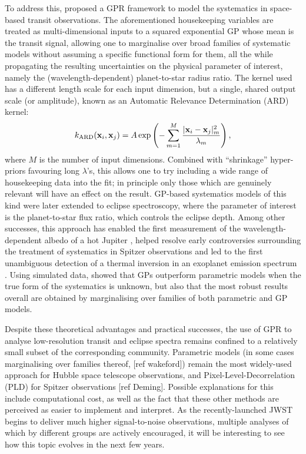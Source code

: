 \documentclass[letterpaper]{ar-1col}
\begin{document}
To address this, \citet{2012MNRAS.419.2683G} proposed a GPR framework to model the systematics in space-based transit observations. The aforementioned housekeeping variables are treated as multi-dimensional inputs to a squared exponential GP whose mean is the transit signal, allowing one to marginalise over broad families of systematic models without assuming a specific functional form for them, all the while propagating the resulting uncertainties on the physical parameter of interest, namely the (wavelength-dependent) planet-to-star radius ratio. The kernel used has a different length scale for each input dimension, but a single, shared output scale (or amplitude), known as an Automatic Relevance Determination (ARD) kernel:
\begin{equation}
    k_{\rm ARD}(\mathbf{x}_i, \mathbf{x}_j) = A \exp \left( - \sum_{m=1}^M \frac{|\mathbf{x}_i-\mathbf{x}_j|_m^2}{\lambda_m} \right),
\end{equation}
where $M$ is the number of input dimensions. Combined with ``shrinkage'' hyper-priors favouring long $\lambda$'s, this allows one to try including a wide range of housekeeping data into the fit; in principle only those which are genuinely relevant will have an effect on the result.
GP-based systematics models of this kind were later extended to eclipse spectroscopy, where the parameter of interest is the planet-to-star flux ratio, which controls the eclipse depth. Among other successes, this approach has enabled the first measurement of the wavelength-dependent albedo of a hot Jupiter \citep{2013ApJ...772L..16E}, helped resolve early controversies surrounding the treatment of systematics in Spitzer observations \citep{2015MNRAS.451..680E} and
led to the first unambiguous detection of a thermal inversion in an exoplanet emission spectrum \citep{2017Natur.548...58E}. Using simulated data, \citet{2014MNRAS.445.3401G} showed that GPs outperform parametric models when the true form of the systematics is unknown, but also that the most robust results overall are obtained by marginalising over families of both parametric and GP models.

Despite these theoretical advantages and practical successes, the use of GPR to analyse low-resolution transit and eclipse spectra remains confined to a relatively small subset of the corresponding community. Parametric models (in some cases marginalising over families thereof, [ref wakeford]) remain the most widely-used approach for Hubble space telescope observations, and Pixel-Level-Decorrelation (PLD) for Spitzer observations [ref Deming]. Possible explanations for this include computational cost, as well as the fact that these other methods are perceived as easier to implement and interpret. As the recently-launched JWST begins to deliver much higher signal-to-noise observations, multiple analyses of which by different groups are actively encouraged, it will be interesting to see how this topic evolves in the next few years.
\end{document}
